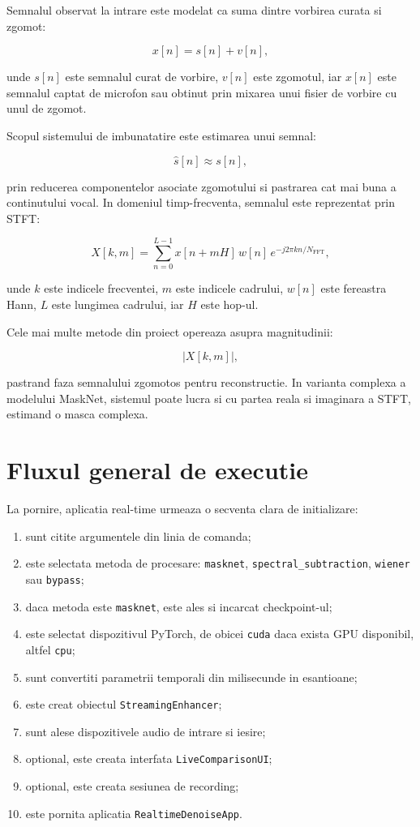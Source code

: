 Semnalul observat la intrare este modelat ca suma dintre vorbirea curata si
zgomot:

\[
x[n] = s[n] + v[n],
\]

unde \(s[n]\) este semnalul curat de vorbire, \(v[n]\) este zgomotul, iar
\(x[n]\) este semnalul captat de microfon sau obtinut prin mixarea unui fisier
de vorbire cu unul de zgomot.

Scopul sistemului de imbunatatire este estimarea unui semnal:

\[
\hat{s}[n] \approx s[n],
\]

prin reducerea componentelor asociate zgomotului si pastrarea cat mai buna a
continutului vocal. In domeniul timp-frecventa, semnalul este reprezentat prin
STFT:

\[
X[k,m] =
\sum_{n=0}^{L-1} x[n + mH] \, w[n] \, e^{-j2\pi kn/N_{\text{FFT}}},
\]

unde \(k\) este indicele frecventei, \(m\) este indicele cadrului, \(w[n]\)
este fereastra Hann, \(L\) este lungimea cadrului, iar \(H\) este hop-ul.

Cele mai multe metode din proiect opereaza asupra magnitudinii:

\[
|X[k,m]|,
\]

pastrand faza semnalului zgomotos pentru reconstructie. In varianta complexa a
modelului MaskNet, sistemul poate lucra si cu partea reala si imaginara a STFT,
estimand o masca complexa.

\section{Fluxul general de executie}

La pornire, aplicatia real-time urmeaza o secventa clara de initializare:

\begin{enumerate}
    \item sunt citite argumentele din linia de comanda;
    \item este selectata metoda de procesare: \texttt{masknet},
    \texttt{spectral\_subtraction}, \texttt{wiener} sau \texttt{bypass};
    \item daca metoda este \texttt{masknet}, este ales si incarcat checkpoint-ul;
    \item este selectat dispozitivul PyTorch, de obicei \texttt{cuda} daca exista
    GPU disponibil, altfel \texttt{cpu};
    \item sunt convertiti parametrii temporali din milisecunde in esantioane;
    \item este creat obiectul \texttt{StreamingEnhancer};
    \item sunt alese dispozitivele audio de intrare si iesire;
    \item optional, este creata interfata \texttt{LiveComparisonUI};
    \item optional, este creata sesiunea de recording;
    \item este pornita aplicatia \texttt{RealtimeDenoiseApp}.
\end{enumerate}

